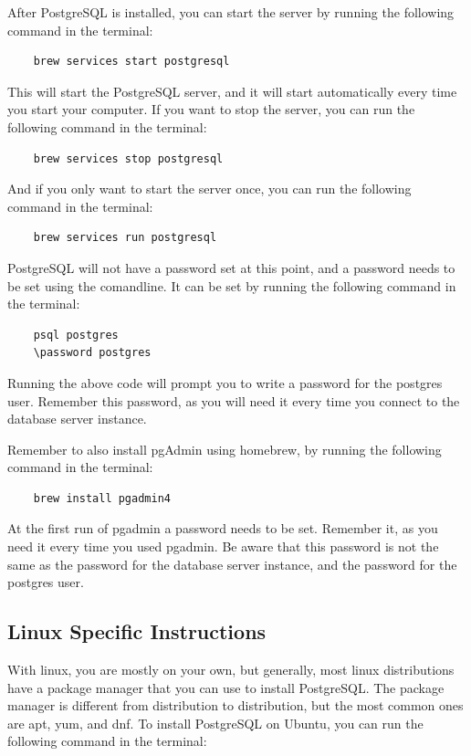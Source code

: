 After PostgreSQL is installed, you can start the server by running the following command in the terminal:

\begin{verbatim}
    brew services start postgresql
\end{verbatim}

This will start the PostgreSQL server, and it will start automatically every time you start your computer. If you want to stop the server, you can run the following command in the terminal:

\begin{verbatim}
    brew services stop postgresql
\end{verbatim}

And if you only want to start the server once, you can run the following command in the terminal:

\begin{verbatim}
    brew services run postgresql
\end{verbatim}


PostgreSQL will not have a password set at this point, and a password needs to be set using the comandline. It can be set by running the following command in the terminal:

\begin{verbatim}
    psql postgres
    \password postgres
\end{verbatim}

Running the above code will prompt you to write a password for the postgres user. Remember this password, as you will need it every time you connect to the database server instance. 


Remember to also install pgAdmin using homebrew, by running the following command in the terminal:
\begin{verbatim}
    brew install pgadmin4
\end{verbatim}

At the first run of pgadmin a password needs to be set. Remember it, as you need it every time you used pgadmin. Be aware that this password is not the same as the password for the database server instance, and the password for the postgres user.


\subsection{Linux Specific Instructions}
With linux, you are mostly on your own, but generally, most linux distributions have a package manager that you can use to install PostgreSQL. The package manager is different from distribution to distribution, but the most common ones are apt, yum, and dnf. To install PostgreSQL on Ubuntu, you can run the following command in the terminal:

